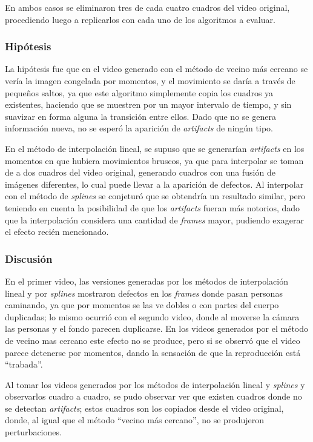                 En ambos casos se eliminaron tres de cada cuatro cuadros del video original, procediendo luego a replicarlos con cada uno de los algoritmos a evaluar.

            \subsubsection*{Hipótesis}

                La hipótesis fue que en el video generado con el método de vecino más cercano se vería la imagen congelada por momentos, y el movimiento se daría a través de pequeños saltos, ya que este algoritmo simplemente copia los cuadros ya existentes, haciendo que se muestren por un mayor intervalo de tiempo, y sin suavizar en forma alguna la transición entre ellos. Dado que no se genera información nueva, no se esperó la aparición de \emph{artifacts} de ningún tipo.

                En el método de interpolación lineal, se supuso que se generarían \emph{artifacts} en los momentos en que hubiera movimientos bruscos, ya que para interpolar se toman de a dos cuadros del video original, generando cuadros con una fusión de imágenes diferentes, lo cual puede llevar a la aparición de defectos. Al interpolar con el método de \emph{splines} se conjeturó que se obtendría un resultado similar, pero teniendo en cuenta la posibilidad de que los \emph{artifacts} fueran más notorios, dado que la interpolación considera una cantidad de \emph{frames} mayor, pudiendo exagerar el efecto recién mencionado.


            \subsubsection*{Discusión}

                En el primer video, las versiones generadas por los métodos de interpolación lineal y por \emph{splines} mostraron defectos en los \emph{frames} donde pasan personas caminando, ya que por momentos se las ve dobles o con partes del cuerpo duplicadas; lo mismo ocurrió con el segundo video, donde al moverse la cámara las personas y el fondo parecen duplicarse. En los videos generados por el método de vecino mas cercano este efecto no se produce, pero si se observó que el video parece detenerse por momentos, dando la sensación de que la reproducción está ``trabada''.

                Al tomar los videos generados por los métodos de interpolación lineal y \emph{splines} y observarlos cuadro a cuadro, se pudo observar ver que existen cuadros donde no se detectan \emph{artifacts}; estos cuadros son los copiados desde el video original, donde, al igual que el método ``vecino más cercano'', no se produjeron perturbaciones.

